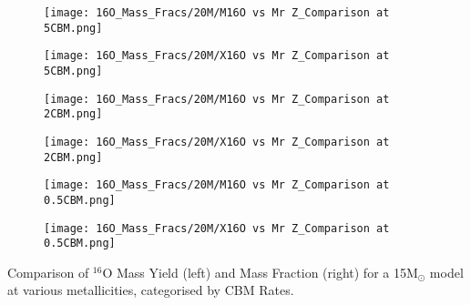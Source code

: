 \begin{minipage}{\textwidth}
	\centering
	\begin{subfigure}{0.49\textwidth}
		\texttt{[image: 16O\_Mass\_Fracs/20M/M16O vs Mr Z\_Comparison at 5CBM.png]}
	\end{subfigure}
        \hfill
	\begin{subfigure}{0.49\textwidth}
		\texttt{[image: 16O\_Mass\_Fracs/20M/X16O vs Mr Z\_Comparison at 5CBM.png]}
	\end{subfigure}
        \label{fig:16O_20M_5CBM}
\end{minipage}
\begin{minipage}{\textwidth}
	\centering
	\begin{subfigure}{0.49\textwidth}
		\texttt{[image: 16O\_Mass\_Fracs/20M/M16O vs Mr Z\_Comparison at 2CBM.png]}
	\end{subfigure}
        \hfill
	\begin{subfigure}{0.49\textwidth}
		\texttt{[image: 16O\_Mass\_Fracs/20M/X16O vs Mr Z\_Comparison at 2CBM.png]}
	\end{subfigure}
        \label{fig:16O_20M_5CBM}
\end{minipage}
\begin{minipage}{\textwidth}
	\centering
	\begin{subfigure}{0.49\textwidth}
		\texttt{[image: 16O\_Mass\_Fracs/20M/M16O vs Mr Z\_Comparison at 0.5CBM.png]}
	\end{subfigure}
        \hfill
	\begin{subfigure}{0.49\textwidth}
		\texttt{[image: 16O\_Mass\_Fracs/20M/X16O vs Mr Z\_Comparison at 0.5CBM.png]}
	\end{subfigure}
	 \caption{Comparison of $^{16}$O Mass Yield (left) and Mass Fraction (right) for a 15M$_\odot$ model at various metallicities, categorised by CBM Rates.}
        \label{fig:16O_20M_0.5CBM}
\end{minipage}

